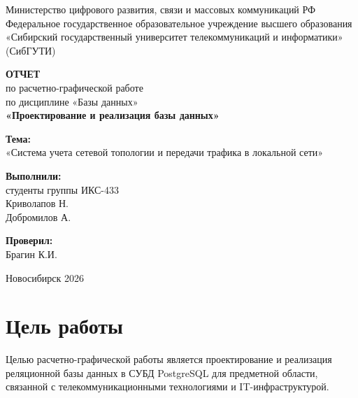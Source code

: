 \documentclass[12pt,a4paper]{article}
\begin{document}
\begin{titlepage}
    \centering
    \footnotesize
    Министерство цифрового развития, связи и массовых коммуникаций РФ\\
    Федеральное государственное образовательное учреждение высшего образования\\
    «Сибирский государственный университет телекоммуникаций и информатики»\\
    (СибГУТИ)

    \vspace{4cm}

    \Large \textbf{ОТЧЕТ}\\
    \large по расчетно-графической работе\\
    по дисциплине «Базы данных»\\
    \textbf{«Проектирование и реализация базы данных»}

    \vspace{1cm}

    \large
    \textbf{Тема:}\\
    «Система учета сетевой топологии и передачи трафика в локальной сети»

    \vspace{4cm}

    \hfill
    \begin{minipage}{0.48\textwidth}
        \textbf{Выполнили:}\\
        студенты группы ИКС-433\\
        Криволапов Н.\\
        Добромилов А.

        \vspace{1cm}

        \textbf{Проверил:}\\
        Брагин К.И.
    \end{minipage}

    \vfill

    Новосибирск 2026
\end{titlepage}

\tableofcontents
\newpage

\section{Цель работы}

Целью расчетно-графической работы является проектирование и реализация реляционной базы данных в СУБД PostgreSQL для предметной области, связанной с телекоммуникационными технологиями и IT-инфраструктурой.
\end{document}
